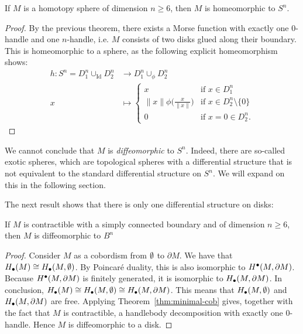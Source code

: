 \begin{corollary}
    If $M$ is a homotopy sphere of dimension  $n \ge  6$, then $M$ is homeomorphic to  $S^{n}$.
\end{corollary}
\begin{proof}
    By the previous theorem, there exists a Morse function with exactly one $0$-handle and one $n$-handle, i.e. $M$ consists of two disks glued along their boundary. This is homeomorphic to a sphere, as the following explicit homeomorphism shows:
    \begin{align*}
        h: S^{n} = D_1^{n} \cup_\text{Id}  D_2^{n} &\longrightarrow D_1^{n} \cup_\phi D_2^{n} \\
         x &\longmapsto 
         \begin{cases}
             x & \text{if $x \in D_1^{n}$}\\
             \|x\| \phi\Big(\frac{x}{\|x\|}\Big) & \text{if $x \in D_2 ^{n} \setminus \{0\} $}\\
             0 & \text{if $x = 0 \in D_2^{n}$.}
         \end{cases}
    \end{align*}
\end{proof}
\begin{remark}
    We cannot conclude that $M$ is \emph{diffeomorphic} to $S^{n}$.
    Indeed, there are so-called exotic spheres, which are topological spheres with a differential structure that is not equivalent to the standard differential structure on $S^{n}$.
    We will expand on this in the following section.
\end{remark}

The next result shows that there is only one differential structure on disks:
\begin{theorem}
    If $M$ is contractible with a simply connected boundary and of dimension $n \ge  6$, then $M$ is diffeomorphic to $B^{n}$
\end{theorem}
\begin{proof}
    Consider $M$ as a cobordism from  $\emptyset$ to  $\partial M$.
    We have that  $H_\bullet(M) \cong H_\bullet(M, \emptyset)$.
    By Poincaré duality, this is also isomorphic to  $H^\bullet(M, \partial M)$.
    Because  $H^{\bullet}(M, \partial M)$ is finitely generated, it is isomorphic to $H_\bullet(M, \partial M)$.
    In conclusion, $H_\bullet(M) \cong H_\bullet(M, \emptyset) \cong H_\bullet(M, \partial M)$.
    This means that $H_\bullet(M, \emptyset)$ and  $H_\bullet(M, \partial M)$ are free.
    Applying Theorem~\ref{thm:minimal-cob} gives, together with the fact that $M$ is contractible, a handlebody decomposition with exactly one $0$-handle.
    Hence $M$ is diffeomorphic to a disk.
\end{proof}

